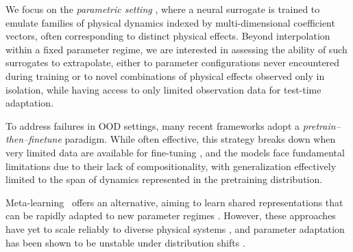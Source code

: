 \documentclass{article}
\theoremstyle{plain}
\theoremstyle{definition}
\theoremstyle{remark}
\begin{document}
We focus on the \emph{parametric setting} \citep{approximationpdes}, where a neural surrogate is trained to emulate families of physical dynamics indexed by multi-dimensional coefficient vectors, often corresponding to distinct physical effects. Beyond interpolation within a fixed parameter regime, we are interested in assessing the ability of such surrogates to extrapolate, either to parameter configurations never encountered during training or to novel combinations of physical effects observed only in isolation, while having access to only limited observation data for test-time adaptation.

To address failures in OOD settings, 
many recent frameworks \citep{mccabe2023multiple, herde2024poseidon, hao2024dpot} adopt a \emph{pretrain–then–finetune} paradigm. While often effective, this strategy breaks down when very limited data are available for fine-tuning \citep{koupai2024geps}, and the models face fundamental limitations due to their lack of compositionality, with generalization effectively limited to the span of dynamics represented in the pretraining distribution.

Meta-learning~\citep{thrun1998learning,finn2017modelagnostic} offers an alternative, aiming to learn shared representations that can be rapidly adapted to new parameter regimes \citep{yin2022leads, kirchmeyer2022generalizing, koupai2024geps, nzoyem2025neural}. However, these approaches have yet to scale reliably to diverse physical systems \citep{ohana2024well, morel2025disco}, and parameter adaptation has been shown to be unstable under 
distribution 
shifts \citep{serrano2025zebra}.
\end{document}
